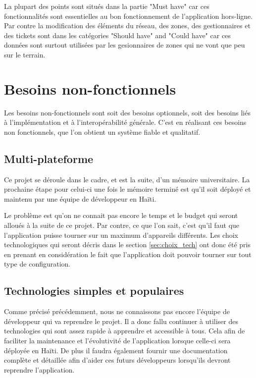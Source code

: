 \documentclass{EPL-master-thesis-covers-FR}
\begin{document}
				La plupart des points sont situés dans la partie "Must have" car ces fonctionnalités sont essentielles au bon fonctionnement de l'application hors-ligne. Par contre la modification des éléments du réseau, des zones, des gestionnaires et des tickets sont dans les catégories "Should have" and "Could have" car ces données sont surtout utilisées par les gesionnaires de zones qui ne vont que peu sur le terrain.			

		\section{Besoins non-fonctionnels}
			Les besoins non-fonctionnels sont soit des besoins optionnels, soit des besoins liés à l'implémentation et à l'interopérabilité générale. C'est en réalisant ces besoins non fonctionnels, que l'on obtient un système fiable et qualitatif.
					
			\subsection*{Multi-plateforme}
			\label{sec:multi}
				Ce projet se déroule dans le cadre, et est la suite, d'un mémoire universitaire. La prochaine étape pour celui-ci une fois le mémoire terminé est qu'il soit déployé et maintenu par une équipe de développeur en Haïti. 
				
				Le problème est qu'on ne connait pas encore le temps et le budget qui seront alloués à la suite de ce projet. Par contre, ce que l'on sait, c'est qu'il faut que l'application puisse tourner sur un maximum d'appareils différents. Les choix technologiques qui seront décris dans le section \ref{sec:choix_tech} ont donc été pris en prenant en considération le fait que l'application doit pouvoir tourner sur tout type de configuration.
				
			\subsection*{Technologies simples et populaires}
				Comme précisé précédemment, nous ne connaissons pas encore l'équipe de développeur qui va reprendre le projet. Il a donc fallu continuer à utiliser des technologies qui sont assez rapide à apprendre et accessible à tous. Cela afin de faciliter la maintenance et l'évolutivité de l'application lorsque celle-ci sera déployée en Haïti.	
				De plus il faudra également fournir une documentation complète et détaillée afin d'aider ces futurs développeurs lorsqu'ils devront reprendre l'application.
				
\end{document}
